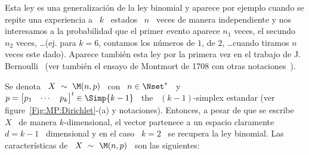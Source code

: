 \label{Sssec:MP:Multinomial}

Esta ley es una generalizaci\'on de la ley binomial y aparece por ejemplo cuando
se  repite  una  experiencia  a  \  $k$  \ estados  \  $n$  \  veces  de  manera
independiente y nos  interesamos a la probabilidad que  el primer evento aparece
$n_1$ veces,  el secundo  $n_2$ veces, \ldots  (ej. para  $k = 6$,  contamos los
n\'umeros de  $1$, de $2$, \ldots  cuando tiramos $n$ veces  este dado). Aparece
tambi\'en    esta   ley    por   la    primera    vez   en    el   trabajo    de
J. Bernoulli~\cite{Ber1713, Hal90} (ver tambi\'en  el ensayo de Montmort de 1708
con otras notaciones~\cite{Mon13}).

Se  denota  \  $X  \ \sim  \  \M(n,p)$  \  con  \  $n  \in  \Nset^*$ \  y  \  $p
= \begin{bmatrix}  p_1 & \cdots  & p_k \end{bmatrix}^t  \in \Simp{k-1}$ \  the \
$(k-1)$-simplex  estandar (ver figure~\ref{Fig:MP:Dirichlet}-(a)  y notaciones).
Entonces, a pesar de que se escribe \ $X$ \ de manera $k$-dimensional, el vector
partenece a un espacio claramente \ $d =  k-1$ \ dimensional y en el caso \ $k =
2$  \ se  recupera la  ley binomial.   Las caracter\'isticas  de \  $X \  \sim \
\M(n,p)$ \ son las siguientes:


